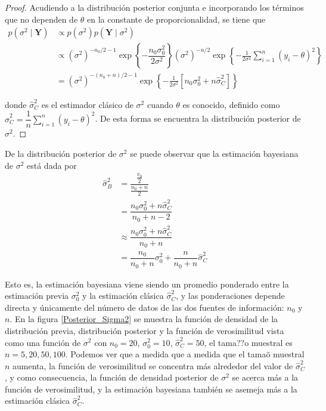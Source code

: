 \documentclass[10pt,openright]{book}\usepackage[]{graphicx}\usepackage[]{color}
\begin{document}
    \begin{proof}
    Acudiendo a la distribuci\'on posterior conjunta e incorporando los t\'erminos que no dependen de $\theta$ en la constante de proporcionalidad, se tiene que
    \begin{align*}
    p(\sigma^2 \mid \mathbf{Y})&\propto p(\sigma^2)p(\mathbf{Y}\mid \sigma^2) \\
    &\propto (\sigma^2)^{-n_0/2-1}\exp\left\{-\dfrac{n_0\sigma_0^2}{2\sigma^2}\right\}(\sigma^2)^{-n/2}\exp\left\{-\frac{1}{2\sigma^2}\sum_{i=1}^n(y_i-\theta)^2\right\}\\
    &= (\sigma^2)^{-(n_0+n)/2-1}\exp\left\{-\frac{1}{2\sigma^2}\left[n_0\sigma_0^2+n\hat{\sigma}^2_C\right]\right\}
    \end{align*}
    
    donde $\hat{\sigma}^2_C$ es el estimador cl\'asico de $\sigma^2$ cuando $\theta$ es conocido, definido como $\hat{\sigma}^2_C=\dfrac{1}{n}\sum_{i=1}^n(y_i-\theta)^2$. De esta forma se encuentra la distribuci\'on posterior de $\sigma^2$.
    \end{proof}
    
    De la distribuci\'on posterior de $\sigma^2$ se puede observar que la estimaci\'on bayesiana de $\sigma^2$ est\'a dada por 
    \begin{align*}
    \hat{\sigma}^2_B&=\dfrac{\frac{v_0}{2}}{\frac{n_0+n}{2}}\\
    &=\dfrac{n_0\sigma^2_0+n\hat{\sigma}^2_C}{n_0+n-2}\\
    &\approx \dfrac{n_0\sigma^2_0+n\hat{\sigma}^2_C}{n_0+n}\\
    &=\dfrac{n_0}{n_0+n}\sigma^2_0+\dfrac{n}{n_0+n}\hat{\sigma}^2_C
    \end{align*}
    
    Esto es, la estimaci\'on bayesiana viene siendo un promedio ponderado entre la estimaci\'on previa $\sigma^2_0$ y la estimaci\'on cl\'asica $\hat{\sigma}^2_C$, y las ponderaciones depende directa y \'unicamente del n\'umero de datos de las dos fuentes de informaci\'on: $n_0$ y $n$. En la figura \ref{Posterior_Sigma2} se muestra la funci\'on de densidad de la distribuci\'on previa, distribuci\'on posterior y la funci\'on de verosimilitud vista como una funci\'on de $\sigma^2$ con $n_0=20$, $\sigma^2_0=10$, $\hat{\sigma}^2_C=50$, el tama??o muestral es $n=5,20,50,100$. Podemos ver que a medida que a medida que el tama\~o muestral $n$ aumenta, la funci\'on de verosimilitud se concentra m\'as alrededor del valor de $\hat{\sigma}^2_C$, y como consecuencia, la funci\'on de densidad posterior de $\sigma^2$ se acerca m\'as a la funci\'on de verosimilitud, y la estimaci\'on bayesiana tambi\'en se asemeja m\'as a la estimaci\'on cl\'asica $\hat{\sigma}^2_C$.
    
\end{document}

